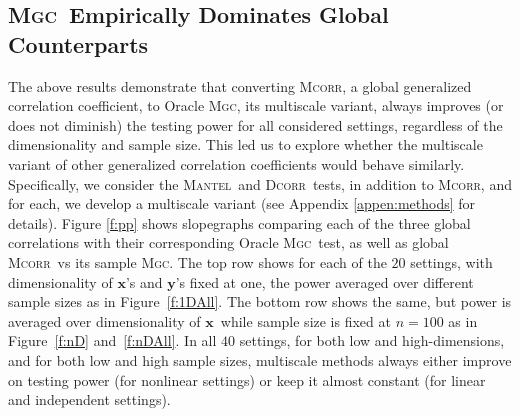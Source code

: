 \documentclass[11pt]{article}
\providecommand{\sct}[1]{{\normalfont\textsc{#1}}}
\providecommand{\mb}[1]{\boldsymbol{#1}}
\newcommand{\Mgc}{\sct{Mgc}}
\newcommand{\Dcorr}{\sct{Dcorr}}
\newcommand{\Mcorr}{\sct{Mcorr}}
\newcommand{\Mantel}{\sct{Mantel}}
\newcommand{\mbx}{\ensuremath{\mb{x}}}
\newcommand{\mby}{\ensuremath{\mb{y}}}
\begin{document}
\subsection*{\Mgc~Empirically Dominates Global Counterparts}

The above results demonstrate that converting \Mcorr, a global generalized correlation coefficient, to Oracle \Mgc, its multiscale variant, always improves (or does not diminish) the testing power for all considered settings, regardless of the dimensionality and sample size.  This led us to explore whether the multiscale variant of other generalized correlation coefficients would behave similarly.  Specifically, we consider the \Mantel~and \Dcorr~tests, in addition to \Mcorr, and for each, we develop a multiscale variant (see Appendix \ref{appen:methods} for details). 
Figure \ref{f:pp} shows slopegraphs comparing each of the three global correlations with their corresponding Oracle \Mgc~test, as well as global \Mcorr~vs its sample \Mgc.  The top row shows for each of the $20$ settings, with dimensionality of \mbx's and \mby's  fixed at one, the  power averaged over different sample sizes as in Figure~\ref{f:1DAll}.  The bottom row shows the same, but power is averaged over dimensionality of \mbx~while sample size is fixed at $n=100$ as in Figure~\ref{f:nD} and~\ref{f:nDAll}.  In all $40$ settings, for both low and high-dimensions, and for both low and high sample sizes, multiscale methods always either improve on testing power (for nonlinear settings) or keep it almost constant (for linear and independent settings). 
\end{document}
